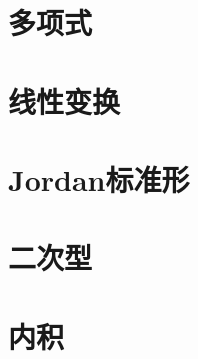 \documentclass{ctexbook}
\begin{document}
	\chapter{多项式}
	\chapter{线性变换}
	\chapter{Jordan标准形}
	\chapter{二次型}
	\chapter{内积}
\end{document}
